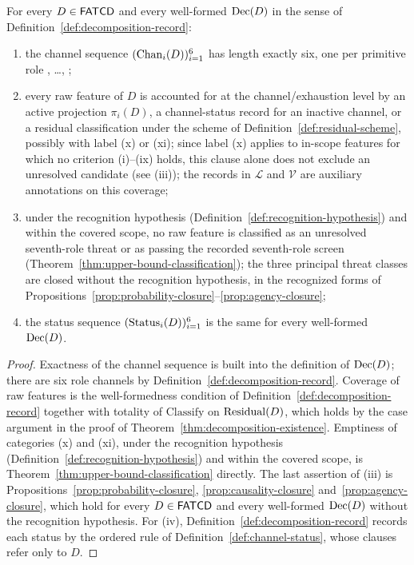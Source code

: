 \begin{theorem}\label{thm:six-channel-exactness}
For every \(D \in \mathsf{FATCD}{}\) and every well-formed
\(\operatorname{Dec}\!\left(D\right)\) in the sense of
Definition~\ref{def:decomposition-record}:
\begin{enumerate}[label=(\roman*),topsep=2pt,itemsep=1pt]
  \item the channel sequence \((\operatorname{Chan}_{i}\!\left(D\right))_{i=1}^{6}\) has length
    exactly six, one per primitive role \Pone{}, \ldots, \Psix{};
  \item every raw feature of \(D\) is accounted for at the
    channel/exhaustion level by an active projection \(\pi_i(D)\), a
    channel-status record for an inactive channel, or a residual
    classification under the scheme of
    Definition~\ref{def:residual-scheme}, possibly with label (x) or (xi);
    since label (x) applies to in-scope features for which no criterion
    (i)--(ix) holds, this clause alone does not exclude an unresolved
    candidate (see (iii)); the records in \(\mathcal{L}\)
    and \(\mathcal{V}\) are auxiliary annotations on this coverage;
  \item under the recognition hypothesis
    (Definition~\ref{def:recognition-hypothesis}) and within the covered scope,
    no raw feature is classified as an unresolved seventh-role threat or as
    passing the recorded seventh-role screen
    (Theorem~\ref{thm:upper-bound-classification}); the three principal threat
    classes are closed without the recognition hypothesis, in the
    recognized forms of
    Propositions~\ref{prop:probability-closure}--\ref{prop:agency-closure};
  \item the status sequence \((\operatorname{Status}_{i}\!\left(D\right))_{i=1}^{6}\) is the same for every
    well-formed \(\operatorname{Dec}\!\left(D\right)\).
\end{enumerate}
\end{theorem}

\begin{proof}
Exactness of the channel sequence is built into the definition of
\(\operatorname{Dec}\!\left(D\right)\); there are six role channels by
Definition~\ref{def:decomposition-record}. Coverage of raw features is
the well-formedness condition of
Definition~\ref{def:decomposition-record} together with totality of
\(\mathrm{Classify}\) on \(\operatorname{Residual}\!\left(D\right)\), which holds by the case argument in
the proof of Theorem~\ref{thm:decomposition-existence}. Emptiness of categories (x) and (xi),
under the recognition hypothesis (Definition~\ref{def:recognition-hypothesis})
and within the covered scope, is
Theorem~\ref{thm:upper-bound-classification} directly. The last assertion of
(iii) is Propositions~\ref{prop:probability-closure},
\ref{prop:causality-closure} and~\ref{prop:agency-closure}, which hold for
every \(D\in\mathsf{FATCD}{}\) and every well-formed \(\operatorname{Dec}\!\left(D\right)\) without the
recognition hypothesis. For (iv), Definition~\ref{def:decomposition-record}
records each status by the ordered rule of Definition~\ref{def:channel-status},
whose clauses refer only to \(D\).
\end{proof}

